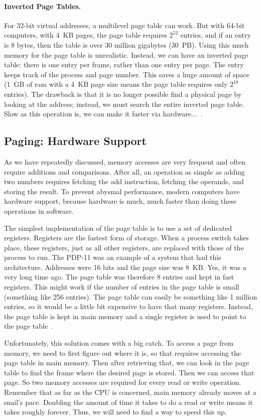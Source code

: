 \paragraph{Inverted Page Tables.} 
For 32-bit virtual addresses, a multilevel page table can work. But with 64-bit computers, with 4~KB pages, the page table requires $2^{52}$ entries, and if an entry is 8 bytes, then the table is over 30 million gigabytes (30~PB). Using this much memory for the page table is unrealistic. Instead, we can have an inverted page table: there is one entry per frame, rather than one entry per page. The entry keeps track of the process and page number. This saves a huge amount of space (1~GB of ram with a 4~KB page size means the page table requires only $2^{18}$ entries). The drawback is that it is no longer possible find a physical page by looking at the address; instead, we must search the entire inverted page table. Slow as this operation is, we can make it faster via hardware...~\cite{mos}.

\subsection*{Paging: Hardware Support}
As we have repeatedly discussed, memory accesses are very frequent and often require additions and comparisons. After all, an operation as simple as adding two numbers requires fetching the add instruction, fetching the operands, and storing the result. To prevent abysmal performance, modern computers have hardware support, because hardware is much, much faster than doing these operations in software.

The simplest implementation of the page table is to use a set of dedicated registers. Registers are the fastest form of storage. When a process switch takes place, these registers, just as all other registers, are replaced with those of the process to run. The PDP-11 was an example of a system that had this architecture. Addresses were 16 bits and the page size was 8~KB. Yes, it was a very long time ago. The page table was therefore 8 entries and kept in fast registers. This might work if the number of entries in the page table is small (something like 256 entries). The page table can easily be something like 1 million entries, so it would be a little bit expensive to have that many registers. Instead, the page table is kept in main memory and a single register is used to point to the page table~\cite{osc}.

Unfortunately, this solution comes with a big catch. To access a page from memory, we need to first figure out where it is, so that requires accessing the page table in main memory. Then after retrieving that, we can look in the page table to find the frame where the desired page is stored. Then we can access that page. So two memory accesses are required for every read or write operation. Remember that as far as the CPU is concerned, main memory already moves at a snail's pace. Doubling the amount of time it takes to do a read or write means it takes roughly forever. Thus, we will need to find a way to speed this up.


